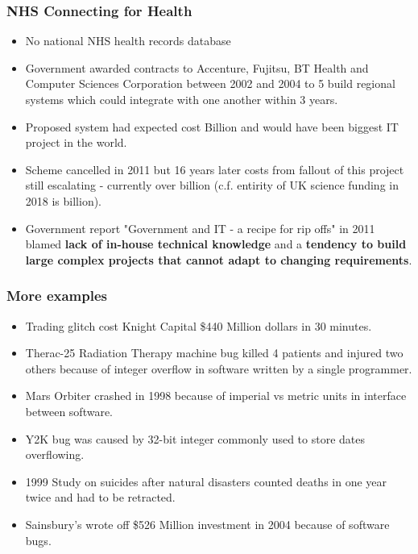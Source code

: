 \documentclass{beamer}
\begin{document}
\begin{frame}
    \frametitle{NHS Connecting for Health}
    \begin{itemize}
        \item No national NHS health records database
        \item Government awarded contracts to Accenture, Fujitsu, BT Health and Computer Sciences Corporation between  2002 and 2004 to 5 build regional systems which could integrate with one another within 3 years. 
        \item Proposed system had expected cost  Billion and would have been biggest IT project in the world.
        \item Scheme cancelled in 2011 but 16 years later costs from fallout of this project still escalating - currently over  billion (c.f. entirity of UK science funding in 2018 is  billion).
        \item Government report "Government and IT - a recipe for rip offs" in 2011 blamed \textbf{lack of in-house technical knowledge} and a \textbf{tendency to build large complex projects that cannot adapt to changing requirements}.
    \end{itemize}
\end{frame}

\begin{frame}
    \frametitle{More examples}
    \begin{itemize}
        \item Trading glitch cost Knight Capital \$440 Million dollars in 30 minutes.
        \item Therac-25 Radiation Therapy machine bug killed 4 patients and injured two others because of integer overflow in software written by a single programmer.
        \item Mars Orbiter crashed in 1998 because of imperial vs metric units in interface between software.
        \item Y2K bug was caused by 32-bit integer commonly used to store dates overflowing.
        \item 1999 Study on suicides after natural disasters counted deaths in one year twice and had to be retracted.
        \item Sainsbury's wrote off \$526 Million investment in 2004 because of software bugs.
    \end{itemize}
\end{frame}
\end{document}
